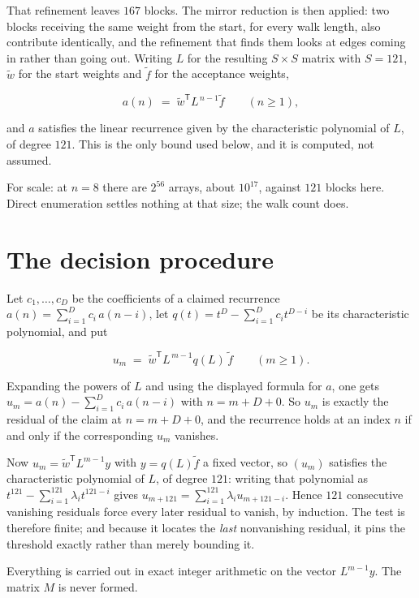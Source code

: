 \documentclass[11pt]{article}
\theoremstyle{definition}
\begin{document}
That refinement leaves $167$ blocks. The mirror reduction is then applied: two blocks receiving the same weight from the start, for every walk length, also contribute identically, and the refinement that finds them looks at edges coming in rather than going out. Writing $L$ for the resulting $S \times S$ matrix with $S = 121$, $\tilde w$ for the start weights and $\tilde f$ for the acceptance weights,

\[a(n) \;=\; \tilde w^{\mathsf T} L^{\,n-1} \tilde f \qquad (n \ge 1),\]

and $a$ satisfies the linear recurrence given by the characteristic polynomial of $L$, of degree $121$. This is the only bound used below, and it is computed, not assumed.

For scale: at $n = 8$ there are $2^{56}$ arrays, about $10^{17}$, against $121$ blocks here. Direct enumeration settles nothing at that size; the walk count does.

\section{The decision procedure}

Let $c_1,\dots,c_D$ be the coefficients of a claimed recurrence $a(n) = \sum_{i=1}^{D} c_i\,a(n-i)$, let $q(t) = t^{D} - \sum_{i=1}^{D} c_i t^{D-i}$ be its characteristic polynomial, and put

\[u_m \;=\; \tilde w^{\mathsf T} L^{\,m-1} q(L)\,\tilde f \qquad (m \ge 1).\]

Expanding the powers of $L$ and using the displayed formula for $a$, one gets $u_m = a(n) - \sum_{i=1}^{D} c_i\,a(n-i)$ with $n = m + D + 0$. So $u_m$ is exactly the residual of the claim at $n = m + D + 0$, and the recurrence holds at an index $n$ if and only if the corresponding $u_m$ vanishes.

Now $u_m = \tilde w^{\mathsf T} L^{m-1} y$ with $y = q(L)\tilde f$ a fixed vector, so $(u_m)$ satisfies the characteristic polynomial of $L$, of degree $121$: writing that polynomial as $t^{121} - \sum_{i=1}^{121} \lambda_i t^{121-i}$ gives $u_{m+121} = \sum_{i=1}^{121} \lambda_i u_{m+121-i}$. Hence $121$ consecutive vanishing residuals force every later residual to vanish, by induction. The test is therefore finite; and because it locates the {\itshape last} nonvanishing residual, it pins the threshold exactly rather than merely bounding it.

Everything is carried out in exact integer arithmetic on the vector $L^{m-1}y$. The matrix $M$ is never formed.
\end{document}
